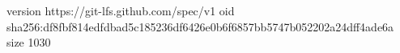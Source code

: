 version https://git-lfs.github.com/spec/v1
oid sha256:df8fbf814edfdbad5c185236df6426e0b6f6857bb5747b052202a24dff4ade6a
size 1030
